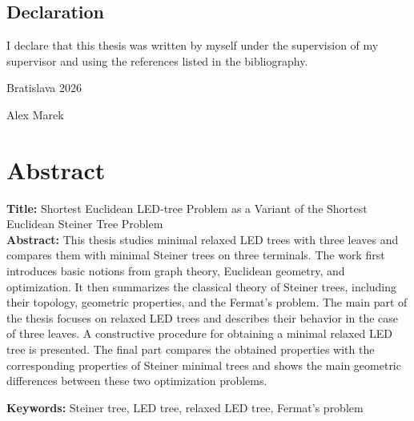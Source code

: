 \documentclass[openany]{book}
\begin{document}
	
	
\clearpage
\thispagestyle{empty}
\mbox{}
\clearpage
\clearpage

\vfill

\subsection*{Declaration}

I declare that this thesis was written by myself under the supervision of my supervisor and using the references listed in the bibliography.

\vspace{10pt}

\noindent Bratislava 2026
\newline

\begin{flushright}
	Alex Marek
\end{flushright}
	\section*{Abstract}
	\noindent \textbf{Title:} Shortest Euclidean LED-tree Problem as a Variant of the Shortest Euclidean Steiner Tree Problem\\
	\textbf{Abstract:} 
	This thesis studies minimal relaxed LED trees with three leaves and compares them with minimal Steiner trees on three terminals. The work first introduces basic notions from graph theory, Euclidean geometry, and optimization. It then summarizes the classical theory of Steiner trees, including their topology, geometric properties, and the Fermat's problem. The main part of the thesis focuses on relaxed LED trees and describes their behavior in the case of three leaves. A constructive procedure for obtaining a minimal relaxed LED tree is presented. The final part compares the obtained properties with the corresponding properties of Steiner minimal trees and shows the main geometric differences between these two optimization problems.
	
	\vspace{5pt}
	
	\noindent \textbf{Keywords:} Steiner tree, LED tree, relaxed LED tree, Fermat's problem
	
	\vspace{+20pt}
	
\end{document}
